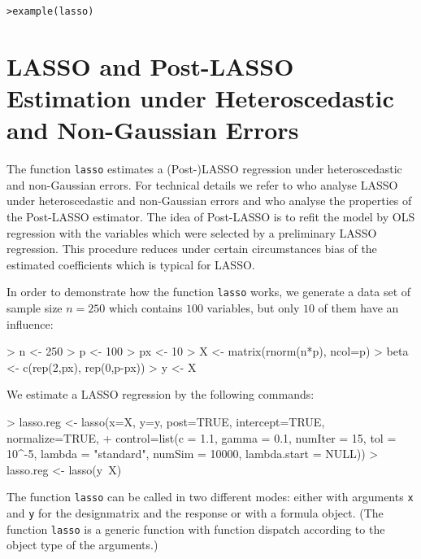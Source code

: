 \documentclass{amsart}
\begin{document}
\vspace{2mm}
\noindent
\texttt{>example(lasso)}

\vspace{2mm}
\noindent

\section{LASSO and Post-LASSO Estimation under Heteroscedastic and Non-Gaussian Errors}
The function \texttt{lasso} estimates a (Post-)LASSO regression under heteroscedastic and non-Gaussian errors. For technical details we refer to \cite{BCCH12} who analyse LASSO under heteroscedastic and non-Gaussian errors and \cite{BC-PostLASSO} who analyse the properties of the Post-LASSO estimator. The idea of Post-LASSO is to refit the model by OLS regression with the variables which were selected by a preliminary LASSO regression. This procedure reduces under certain circumstances bias of the estimated coefficients which is typical for LASSO.

In order to demonstrate how the function \texttt{lasso} works, we generate a data set of sample size $n=250$ which contains $100$ variables, but only $10$ of them have an influence:
\begin{Schunk}
\begin{Sinput}
> n <- 250
> p <- 100
> px <- 10
> X <- matrix(rnorm(n*p), ncol=p)
> beta <- c(rep(2,px), rep(0,p-px))
> y <- X %
\end{Sinput}
\end{Schunk}
We estimate a LASSO regression by the following commands:
\begin{Schunk}
\begin{Sinput}
> lasso.reg <- lasso(x=X, y=y, post=TRUE, intercept=TRUE, normalize=TRUE, 
+       control=list(c = 1.1, gamma = 0.1, numIter = 15, tol = 10^-5, lambda = "standard", numSim = 10000, lambda.start = NULL))
> lasso.reg <- lasso(y~X) 
\end{Sinput}
\end{Schunk}
The function \texttt{lasso} can be called in two different modes: either with arguments \texttt{x} and \texttt{y} for the designmatrix and the response or with a formula object. (The function \texttt{lasso} is a generic function with function dispatch according to the object type of the arguments.)
\end{document}
